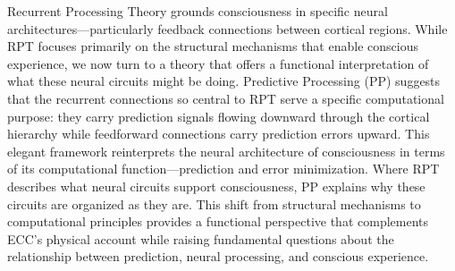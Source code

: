Recurrent Processing Theory grounds consciousness in specific neural architectures—particularly feedback connections between cortical regions. While RPT focuses primarily on the structural mechanisms that enable conscious experience, we now turn to a theory that offers a functional interpretation of what these neural circuits might be doing. Predictive Processing (PP) suggests that the recurrent connections so central to RPT serve a specific computational purpose: they carry prediction signals flowing downward through the cortical hierarchy while feedforward connections carry prediction errors upward. This elegant framework reinterprets the neural architecture of consciousness in terms of its computational function—prediction and error minimization. Where RPT describes what neural circuits support consciousness, PP explains why these circuits are organized as they are. This shift from structural mechanisms to computational principles provides a functional perspective that complements ECC's physical account while raising fundamental questions about the relationship between prediction, neural processing, and conscious experience.

